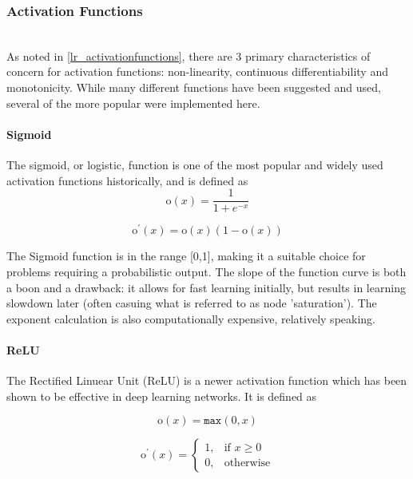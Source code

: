 \documentclass[a4paper,11pt,oneside]{article}
\theoremstyle{plain}
\theoremstyle{definition}
\begin{document}
\subsubsection{Activation Functions}\label{imp_activation_functions}
~\\
As noted in \ref{lr_activationfunctions}, there are 3 primary characteristics of concern for activation functions: non-linearity, continuous differentiability and monotonicity. While many different functions have been suggested and used, several of the more popular were implemented here.

\paragraph{Sigmoid}

The sigmoid, or logistic, function is one of the most popular and widely used activation functions historically, and is defined as 
\begin{equation}\label{func_sigmoid}
\mathrm{o}(x) = \frac{1}{1 + e^{-x}}
\end{equation}

\begin{equation}\label{func_sigmoidprime}
\mathrm{o}^\prime(x) = \mathrm{o}(x)(1-\mathrm{o}(x))
\end{equation}

The Sigmoid function is in the range [0,1], making it a suitable choice for problems requiring a probabilistic output. The slope of the function curve is both a boon and a drawback: it allows for fast learning initially, but results in learning slowdown later (often casuing what is referred to as node 'saturation'). The exponent calculation is also computationally expensive, relatively speaking.

\paragraph{ReLU}

The Rectified Linuear Unit (ReLU) is a newer activation function which has been shown to be effective in deep learning networks. It is defined as

\begin{equation}\label{func_relu}
\mathrm{o}(x) = \texttt{max}(0, x)
\end{equation}

\begin{equation}\end{equation}\label{func_relu_prime}
\[
\mathrm{o}^\prime(x)= 
\begin{cases}
1,& \text{if } x\geq 0\\
0,              & \text{otherwise}
\end{cases}
\]
\end{document}
